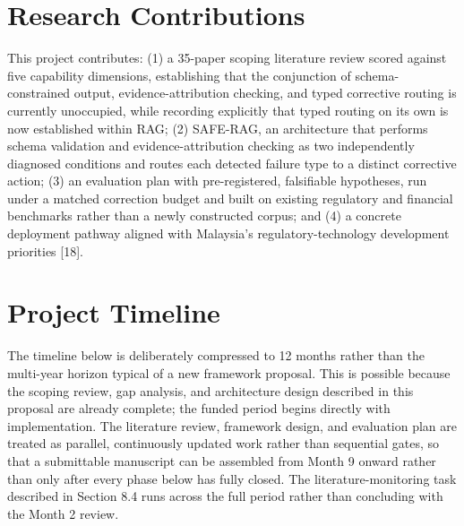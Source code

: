 \documentclass[11pt,a4paper]{article}
\begin{document}
\section{Research Contributions}

This project contributes: (1) a 35-paper scoping literature review scored against five
capability dimensions, establishing that the conjunction of schema-constrained output,
evidence-attribution checking, and typed corrective routing is currently unoccupied, while
recording explicitly that typed routing on its own is now established within RAG;
(2) SAFE-RAG, an architecture that performs schema validation and evidence-attribution
checking as two independently diagnosed conditions and routes each detected failure type
to a distinct corrective action; (3) an evaluation plan with pre-registered, falsifiable
hypotheses, run under a matched correction budget and built on existing regulatory and
financial benchmarks rather than a newly constructed corpus; and (4) a concrete deployment
pathway aligned with Malaysia's regulatory-technology development priorities [18].

\section{Project Timeline}

The timeline below is deliberately compressed to 12 months rather than the multi-year
horizon typical of a new framework proposal. This is possible because the scoping review,
gap analysis, and architecture design described in this proposal are already complete; the
funded period begins directly with implementation. The literature review, framework
design, and evaluation plan are treated as parallel, continuously updated work rather than
sequential gates, so that a submittable manuscript can be assembled from Month 9 onward
rather than only after every phase below has fully closed. The literature-monitoring task
described in Section 8.4 runs across the full period rather than concluding with the
Month 2 review.

\vspace{6pt}
\end{document}
